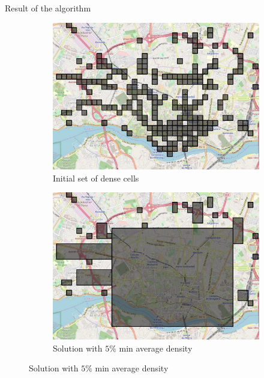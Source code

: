 \documentclass[10pt]{beamer}
\begin{document}
\begin{frame}{Result of the algorithm}
\begin{figure}
    \begin{subfigure}{0.49\textwidth}
        \includegraphics[scale=0.2]{figures/map/grid-init.pdf}
        \caption{Initial set of dense cells}
    \end{subfigure}
    \begin{subfigure}{0.49\textwidth}
        \includegraphics[scale=0.2]{figures/map/grid-pp.pdf}
        \caption{Solution with $5\%$ min average density}
    \end{subfigure}
\end{figure}
\end{frame}
\end{document}
